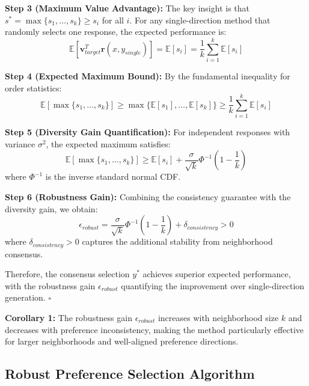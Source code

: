 \documentclass{article} %
\begin{document}
\textbf{Step 3 (Maximum Value Advantage):} The key insight is that $s^* = \max\{s_1, \ldots, s_k\} \geq s_i$ for all $i$. For any single-direction method that randomly selects one response, the expected performance is:
\begin{equation}
\mathbb{E}[\mathbf{v}_{target}^T \mathbf{r}(x, y_{single})] = \mathbb{E}[s_i] = \frac{1}{k}\sum_{i=1}^k \mathbb{E}[s_i]
\end{equation}

\textbf{Step 4 (Expected Maximum Bound):} By the fundamental inequality for order statistics:
\begin{equation}
\mathbb{E}[\max\{s_1, \ldots, s_k\}] \geq \max\{\mathbb{E}[s_1], \ldots, \mathbb{E}[s_k]\} \geq \frac{1}{k}\sum_{i=1}^k \mathbb{E}[s_i]
\end{equation}

\textbf{Step 5 (Diversity Gain Quantification):} For independent responses with variance $\sigma^2$, the expected maximum satisfies:
\begin{equation}
\mathbb{E}[\max\{s_1, \ldots, s_k\}] \geq \mathbb{E}[s_i] + \frac{\sigma}{\sqrt{k}} \Phi^{-1}\left(1-\frac{1}{k}\right)
\end{equation}
where $\Phi^{-1}$ is the inverse standard normal CDF.

\textbf{Step 6 (Robustness Gain):} Combining the consistency guarantee with the diversity gain, we obtain:
\begin{equation}
\epsilon_{robust} = \frac{\sigma}{\sqrt{k}} \Phi^{-1}\left(1-\frac{1}{k}\right) + \delta_{consistency} > 0
\end{equation}
where $\delta_{consistency} > 0$ captures the additional stability from neighborhood consensus.

Therefore, the consensus selection $y^*$ achieves superior expected performance, with the robustness gain $\epsilon_{robust}$ quantifying the improvement over single-direction generation. $\square$

\textbf{Corollary 1:} The robustness gain $\epsilon_{robust}$ increases with neighborhood size $k$ and decreases with preference inconsistency, making the method particularly effective for larger neighborhoods and well-aligned preference directions.

\subsection{Robust Preference Selection Algorithm}
\end{document}
